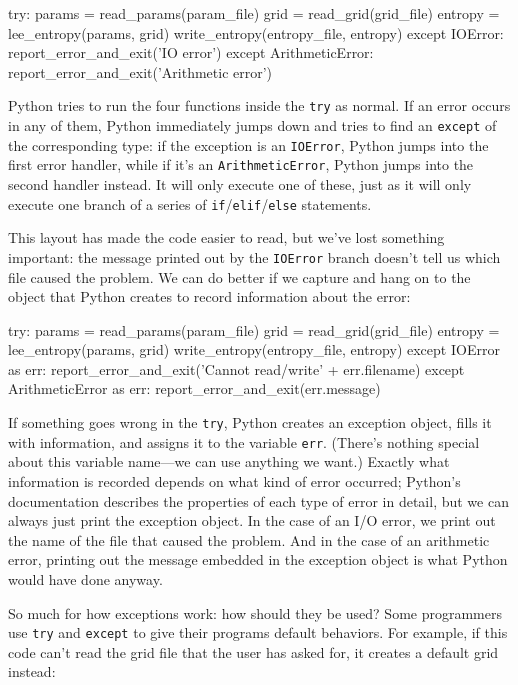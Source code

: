 \documentclass{book}
\begin{document}
\begin{VerbIn}
try:
    params = read_params(param_file)
    grid = read_grid(grid_file)
    entropy = lee_entropy(params, grid)
    write_entropy(entropy_file, entropy)
except IOError:
    report_error_and_exit('IO error')
except ArithmeticError:
    report_error_and_exit('Arithmetic error')
\end{VerbIn}

Python tries to run the four functions inside the \texttt{try} as
normal. If an error occurs in any of them, Python immediately jumps down
and tries to find an \texttt{except} of the corresponding type: if the
exception is an \texttt{IOError}, Python jumps into the first error
handler, while if it's an \texttt{ArithmeticError}, Python jumps into
the second handler instead. It will only execute one of these, just as
it will only execute one branch of a series of
\texttt{if}/\texttt{elif}/\texttt{else} statements.

This layout has made the code easier to read, but we've lost something
important: the message printed out by the \texttt{IOError} branch
doesn't tell us which file caused the problem. We can do better if we
capture and hang on to the object that Python creates to record
information about the error:

\begin{VerbIn}
try:
    params = read_params(param_file)
    grid = read_grid(grid_file)
    entropy = lee_entropy(params, grid)
    write_entropy(entropy_file, entropy)
except IOError as err:
    report_error_and_exit('Cannot read/write' + err.filename)
except ArithmeticError as err:
    report_error_and_exit(err.message)
\end{VerbIn}

If something goes wrong in the \texttt{try}, Python creates an exception
object, fills it with information, and assigns it to the variable
\texttt{err}. (There's nothing special about this variable name---we can
use anything we want.) Exactly what information is recorded depends on
what kind of error occurred; Python's documentation describes the
properties of each type of error in detail, but we can always just print
the exception object. In the case of an I/O error, we print out the name
of the file that caused the problem. And in the case of an arithmetic
error, printing out the message embedded in the exception object is what
Python would have done anyway.

So much for how exceptions work: how should they be used? Some
programmers use \texttt{try} and \texttt{except} to give their programs
default behaviors. For example, if this code can't read the grid file
that the user has asked for, it creates a default grid instead:
\end{document}
